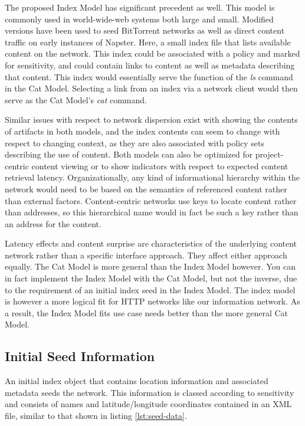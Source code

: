 The proposed Index Model has significant precedent as well.  This model is commonly used in world-wide-web systems both large and small.  Modified versions have been used to seed BitTorrent networks as well as direct content traffic on early instances of Napster.  Here, a small index file that lists available content on the network.  This index could be associated with a policy and marked for sensitivity, and could contain links to content as well as metadata describing that content.  This index would essentially serve the function of the {\em ls} command in the Cat Model.  Selecting a link from an index via a network client would then serve as the Cat Model's {\em cat} command.

Similar issues with respect to network dispersion exist with showing the contents of artifacts in both models, and the index contents can seem to change with respect to changing context, as they are also associated with policy sets describing the use of content.  Both models can also be optimized for project-centric content viewing or to show indicators with respect to expected content retrieval latency.  Organizationally, any kind of informational hierarchy within the network would need to be based on the semantics of referenced content rather than external factors.  Content-centric networks use keys to locate content rather than addresses, so this hierarchical name would in fact be such a key rather than an address for the content.

Latency effects and content surprise are characteristics of the underlying content network rather than a specific interface approach.  They affect either approach equally.  The Cat Model is more general than the Index Model however.  You can in fact implement the Index Model with the Cat Model, but not the inverse, due to the requirement of an initial index seed in the Index Model.  The index model is however a more logical fit for HTTP networks like our information network.  As a result, the Index Model fits use case needs better than the more general Cat Model.

\subsection{Initial Seed Information}
An initial index object that contains location information and associated metadata seeds the network.  This information is classed according to sensitivity and consists of names and latitude/longitude coordinates contained in an XML file, similar to that shown in listing \ref{lst:seed-data}.

